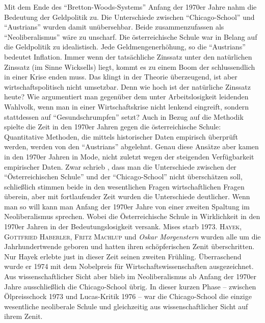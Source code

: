 Mit dem Ende des "`Bretton-Woods-Systems"' Anfang der 1970er Jahre nahm die Bedeutung der Geldpolitik zu. Die Unterschiede zwischen "`Chicago-School"' und "`Austrians"' wurden damit unübersehbar. Beide zusammenzufassen als "`Neoliberalismus"' wäre zu unscharf. Die österreichische Schule war in Belang auf die Geldpolitik zu idealistisch. Jede Geldmengenerhöhung, so die "`Austrians"' bedeutet Inflation. Immer wenn der tatsächliche Zinssatz unter den natürlichen Zinssatz (im Sinne Wicksells) liegt, kommt es zu einem Boom der schlussendlich in einer Krise enden muss. Das klingt in der Theorie überzeugend, ist aber wirtschaftspolitisch nicht umsetzbar. Denn wie hoch ist der natürliche Zinssatz heute? Wie argumentiert man gegenüber dem unter Arbeitslosigkeit leidenden Wahlvolk, wenn man in einer Wirtschaftskrise nicht lenkend eingreift, sondern stattdessen auf "`Gesundschrumpfen"' setzt? Auch in Bezug auf die Methodik spielte die Zeit in den 1970er Jahren gegen die österreichische Schule: Quantitative Methoden, die mittels historischer Daten empirisch überprüft werden, werden von den "`Austrians"' abgelehnt. Genau diese Ansätze aber kamen in den 1970er Jahren in Mode, nicht zuletzt wegen der steigenden Verfügbarkeit empirischer Daten. 
Zwar schrieb \textcite[S. 102]{Kirzner1967}, dass man die Unterschiede zwischen der "`Österreichischen Schule"' und der "`Chicago-School"' nicht überschätzen soll, schließlich stimmen beide in den wesentlichen Fragen wirtschaftlichen Fragen überein, aber mit fortlaufender Zeit wurden die Unterschiede deutlicher. Wenn man so will kann man Anfang der 1970er Jahre von einer zweiten Spaltung im Neoliberalismus sprechen. Wobei die Österreichische Schule in Wirklichkeit in den 1970er Jahren in der Bedeutungslosigkeit versank. Mises starb 1973. \textsc{Hayek, Gottfried Haberler, Fritz Machlup} und \textit{Oskar Morgenstern} wurden alle um die Jahrhundertwende geboren und hatten ihren schöpferischen Zenit überschritten. Nur Hayek erlebte just in dieser Zeit seinen zweiten Frühling. Überraschend wurde er 1974 mit dem Nobelpreis für Wirtschaftswissenschaften ausgezeichnet. Aus wissenschaftlicher Sicht aber blieb im Neoliberalismus ab Anfang der 1970er Jahre ausschließlich die Chicago-School übrig. In dieser kurzen Phase -- zwischen Ölpreisschock 1973 und Lucas-Kritik 1976 -- war die Chicago-School die einzige wesentliche neoliberale Schule und gleichzeitig aus wissenschaftlicher Sicht auf ihrem Zenit.
